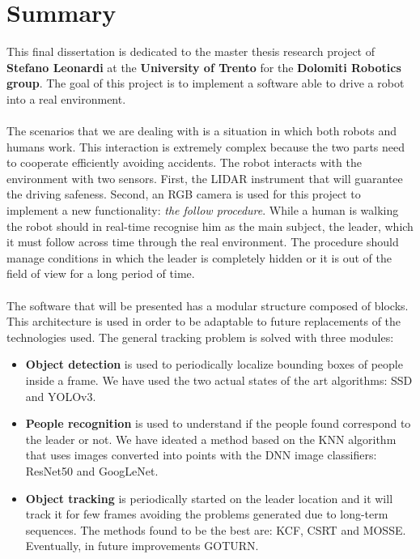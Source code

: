 \chapter*{Summary}\label{cha:summary}
This final dissertation is dedicated to the master thesis research project\cite{projectSourceCode} of \textbf{Stefano Leonardi} at the \textbf{University of Trento} for the \textbf{Dolomiti Robotics group}\cite{dolomitiRobotics}. The goal of this project is to implement a software able to drive a robot into a real environment.\\
\\
The scenarios that we are dealing with is a situation in which both robots and humans work. This interaction is extremely complex because the two parts need to cooperate efficiently avoiding accidents. The robot interacts with the environment with two sensors. First, the LIDAR instrument that will guarantee the driving safeness. Second, an RGB camera is used for this project to implement a new functionality: \textit{the follow procedure}. While a human is walking the robot should in real-time recognise him as the main subject, the leader, which it must follow across time through the real environment. The procedure should manage conditions in which the leader is completely hidden or it is out of the field of view for a long period of time.\\
\\
The software that will be presented has a modular structure composed of blocks. This architecture is used in order to be adaptable to future replacements of the technologies used. The general tracking problem is solved with three modules:
\begin{itemize}
	\item \textbf{Object detection} is used to periodically localize bounding boxes of people inside a frame. We have used the two actual states of the art algorithms: SSD\cite{ssd} and YOLOv3\cite{yoloV3}.
	\item \textbf{People recognition} is used to understand if the people found correspond to the leader or not. We have ideated a method based on the KNN algorithm that uses images converted into points with the DNN image classifiers: ResNet50\cite{resNet_paper} and GoogLeNet\cite{googLeNet_paper}.
	\item \textbf{Object tracking} is periodically started on the leader location and it will track it for few frames avoiding the problems generated due to long-term sequences. The methods found to be the best are: KCF\cite{kcf}, CSRT\cite{csrt} and MOSSE\cite{mosse}. Eventually, in future improvements GOTURN\cite{goturn}.
\end{itemize}
